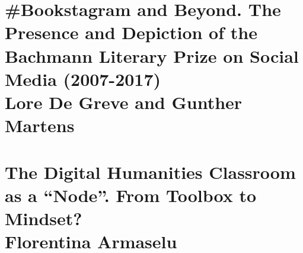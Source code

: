 \documentclass{book}
\newcommand\MyCmd[1]{\mbox{}\clearpage\setcounter{page}{#1}}
\begin{document}
\section{\textbf{\#Bookstagram and Beyond. The \\ Presence and Depiction of the \\ Bachmann Literary Prize on Social \\ Media (2007-2017)} \\ 
Lore De Greve and Gunther Martens}
\MyCmd{103}
\section{\textbf{The Digital Humanities Classroom as a ``Node''. From Toolbox to Mindset?} \\ 
Florentina Armaselu}
\end{document}
